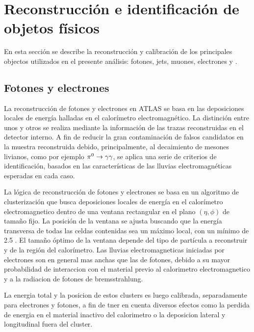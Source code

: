 \chapter{Reconstrucción e identificación de objetos físicos} %
\label{sec:obj_selection}

En esta sección se describe la reconstrucción y calibración de los
principales objectos utilizados en el presente análisis:
fotones, jets, muones, electrones y \met.


\section{Fotones y electrones}
\label{sec:obj_photons}

La reconstrucción de fotones y electrones en ATLAS se basa en las deposiciones
locales de energía halladas en el calorímetro electromagnético. La distinción
entre unos y otros se realiza mediante la información de las trazas
reconstruidas en el detector interno. A fin de reducir la gran contaminación de
falsos candidatos en la muestra reconstruida debido, principalmente, al
decaimiento de mesones livianos, como por ejemplo $\pi^0 \to \gam\gam$, se
aplica una serie de criterios de identificación, basados en las características
de las lluvias electromagnéticas esperadas en cada caso.

La lógica de reconstrucción de fotones y electrones se basa en un
algoritmo de clusterización que busca deposiciones locales de energía en el
calorímetro electromagnetico dentro de una ventana rectangular en el plano $(\eta, \phi)$
de tamaño fijo. La posición de la ventana se ajusta buscando que la energía
transversa de todas las celdas contenidas sea un máximo local, con un mínimo
de 2.5 \gev. El tamaño óptimo de la ventana depende del tipo de partícula a
reconstruir y de la región del calorímetro.
Las lluvias electromagneticas iniciadas por electrones son en general mas anchas
que las de fotones, debido a su mayor probabilidad de interaccion con el material
previo al calorimetro electromagnetico y a la radiacion de fotones de bremsstrahlung.

La energia total y la posicion de estos clusters es luego calibrada, separadamente para
electrones y fotones, a fin de tner en cuenta diversos efectos como la perdida de energia
en el material inactivo del calorimetro o la deposicion lateral y longitudinal fuera del cluster.


